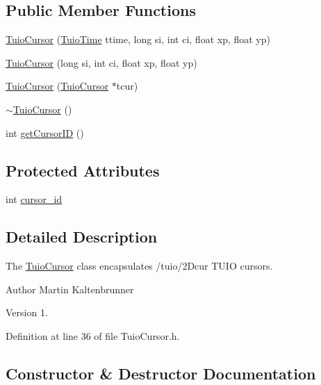 \subsection*{Public Member Functions}
\begin{DoxyCompactItemize}
\item 
\hyperlink{class_t_u_i_o_1_1_tuio_cursor_a8901620d6aee4fef2d568e3d3c04a729}{Tuio\+Cursor} (\hyperlink{class_t_u_i_o_1_1_tuio_time}{Tuio\+Time} ttime, long si, int ci, float xp, float yp)
\item 
\hyperlink{class_t_u_i_o_1_1_tuio_cursor_a3ae0c962c0f2e722b4a16cf963b43c2a}{Tuio\+Cursor} (long si, int ci, float xp, float yp)
\item 
\hyperlink{class_t_u_i_o_1_1_tuio_cursor_ad894df065d0e0059e98da92ad83ed3ff}{Tuio\+Cursor} (\hyperlink{class_t_u_i_o_1_1_tuio_cursor}{Tuio\+Cursor} $\ast$tcur)
\item 
\hyperlink{class_t_u_i_o_1_1_tuio_cursor_ab791383734f2121d7bc217c108213e36}{$\sim$\+Tuio\+Cursor} ()
\item 
int \hyperlink{class_t_u_i_o_1_1_tuio_cursor_a3e8ee1381e61eb54c7563e10a2fafb0b}{get\+Cursor\+ID} ()
\end{DoxyCompactItemize}
\subsection*{Protected Attributes}
\begin{DoxyCompactItemize}
\item 
int \hyperlink{class_t_u_i_o_1_1_tuio_cursor_a6ce31b46c0bb528acc3be28e5dd1e278}{cursor\+\_\+id}
\end{DoxyCompactItemize}


\subsection{Detailed Description}
The \hyperlink{class_t_u_i_o_1_1_tuio_cursor}{Tuio\+Cursor} class encapsulates /tuio/2\+Dcur T\+U\+IO cursors.

\begin{DoxyAuthor}{Author}
Martin Kaltenbrunner 
\end{DoxyAuthor}
\begin{DoxyVersion}{Version}
1. 
\end{DoxyVersion}


Definition at line 36 of file Tuio\+Cursor.\+h.



\subsection{Constructor \& Destructor Documentation}
\mbox{\label{class_t_u_i_o_1_1_tuio_cursor_a8901620d6aee4fef2d568e3d3c04a729}} 

